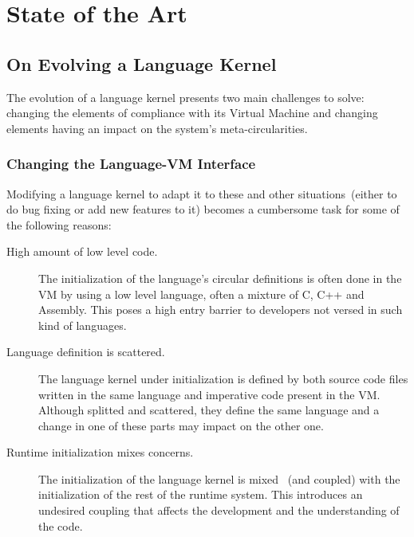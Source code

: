 
\chapter{State of the Art}
\minitoc
\introduction
	
	
\newpage
\section{On Evolving a Language Kernel}

The evolution of a language kernel presents two main challenges to solve: changing the elements of compliance with its Virtual Machine and changing elements having an impact on the system's meta-circularities.

\subsection{Changing the Language-VM Interface}

Modifying a language kernel to adapt it to these and other situations~(either to do bug fixing or add new features to it) becomes a cumbersome task for some of the following reasons: 
\begin{description}
\item[High amount of low level code.] The initialization of the language's circular definitions is often done in the VM by using a low level language, often a mixture of C, C++ and Assembly. This poses a high entry barrier to developers not versed in such kind of languages.
\item[Language definition is scattered.] The language kernel under initialization is defined by both source code files written in the same language and imperative code present in the VM. Although splitted and scattered, they define the same language and a change in one of these parts may impact on the other one.
\item[Runtime initialization mixes concerns.] The initialization of the language kernel is mixed ~(and coupled) with the initialization of the rest of the runtime system. This introduces an undesired coupling that affects the development and the understanding of the code.
\end{description}

